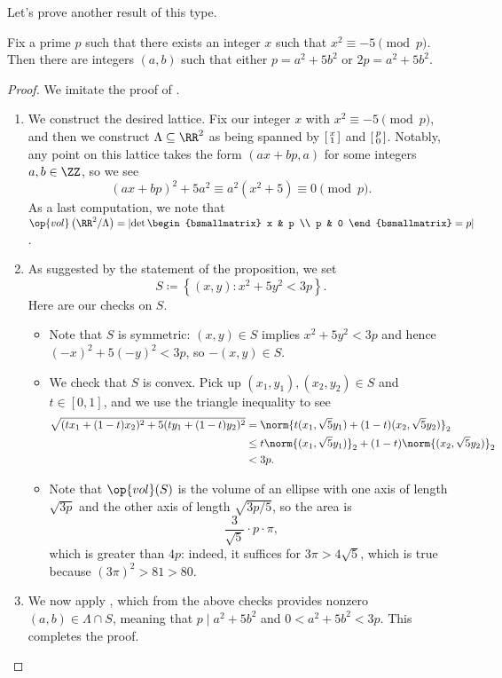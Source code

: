 \documentclass[../notes.tex]{subfiles}
\begin{document}
Let's prove another result of this type.
\begin{proposition} \label{prop:primes-of-form-5}
	Fix a prime $p$ such that there exists an integer $x$ such that $x^2\equiv-5\pmod p$. Then there are integers $(a,b)$ such that either $p=a^2+5b^2$ or $2p=a^2+5b^2$.
\end{proposition}
\begin{proof}
	We imitate the proof of .
	\begin{enumerate}
		\item We construct the desired lattice. Fix our integer $x$ with $x^2\equiv-5\pmod p$, and then we construct $\Lambda\subseteq\RR^2$ as being spanned by $\begin{bsmallmatrix}
			x \\ 1
		\end{bsmallmatrix}$ and $\begin{bsmallmatrix}
			p \\ 0
		\end{bsmallmatrix}$. Notably, any point on this lattice takes the form $(ax+bp,a)$ for some integers $a,b\in\ZZ$, so we see
		\[(ax+bp)^2+5a^2\equiv a^2\left(x^2+5\right)\equiv0\pmod p.\]
		As a last computation, we note that $\op{vol}\left(\RR^2/\Lambda\right)=\left|\det\begin{bsmallmatrix}
			x & p \\
			p & 0
		\end{bsmallmatrix}=p\right|$.
		\item As suggested by the statement of the proposition, we set
		\[S\coloneqq\left\{(x,y):x^2+5y^2<3p\right\}.\]
		Here are our checks on $S$.
		\begin{itemize}
			\item Note that $S$ is symmetric: $(x,y)\in S$ implies $x^2+5y^2<3p$ and hence $(-x)^2+5(-y)^2<3p$, so $-(x,y)\in S$.
			\item We check that $S$ is convex. Pick up $(x_1,y_1),(x_2,y_2)\in S$ and $t\in[0,1]$, and we use the triangle inequality to see
			\begin{align*}
				\sqrt{(tx_1+(1-t)x_2)^2+5(ty_1+(1-t)y_2)^2} &= \norm{t(x_1,\sqrt 5y_1)+(1-t)(x_2,\sqrt5y_2)}_2 \\
				&\le t\norm{(x_1,\sqrt5y_1)}_2+(1-t)\norm{(x_2,\sqrt5y_2)}_2 \\
				&< 3p.
			\end{align*}
			\item Note that $\op{vol}(S)$ is the volume of an ellipse with one axis of length $\sqrt{3p}$ and the other axis of length $\sqrt{3p/5}$, so the area is
			\[\frac3{\sqrt5}\cdot p\cdot\pi,\]
			which is greater than $4p$: indeed, it suffices for $3\pi>4\sqrt5$, which is true because $(3\pi)^2>81>80$.
		\end{itemize}
		\item We now apply , which from the above checks provides nonzero $(a,b)\in\Lambda\cap S$, meaning that $p\mid a^2+5b^2$ and $0<a^2+5b^2<3p$. This completes the proof.
		\qedhere
	\end{enumerate}
\end{proof}
\end{document}
